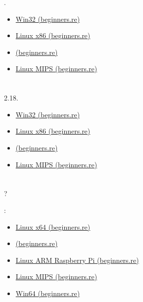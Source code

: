 .

\begin{itemize}
\item \href{http://go.yurichev.com/17175}{Win32 (beginners.re)}
\item \href{http://go.yurichev.com/17176}{Linux x86 (beginners.re)}
\item \href{http://go.yurichev.com/17177}{\MacOSX (beginners.re)}
\item \href{http://go.yurichev.com/17178}{Linux MIPS (beginners.re)}
\end{itemize}

\section{}

 2.18.

\begin{itemize}
\item \href{http://go.yurichev.com/17179}{Win32 (beginners.re)}
\item \href{http://go.yurichev.com/17180}{Linux x86 (beginners.re)}
\item \href{http://go.yurichev.com/17181}{\MacOSX (beginners.re)}
\item \href{http://go.yurichev.com/17182}{Linux MIPS (beginners.re)}
\end{itemize}

\section{}

?

:

\begin{itemize}
\item \href{http://go.yurichev.com/17183}{Linux x64 (beginners.re)}
\item \href{http://go.yurichev.com/17184}{\MacOSX (beginners.re)}
\item \href{http://go.yurichev.com/17185}{Linux ARM Raspberry Pi (beginners.re)}
\item \href{http://go.yurichev.com/17186}{Linux MIPS (beginners.re)}
\item \href{http://go.yurichev.com/17187}{Win64 (beginners.re)}
\end{itemize}
